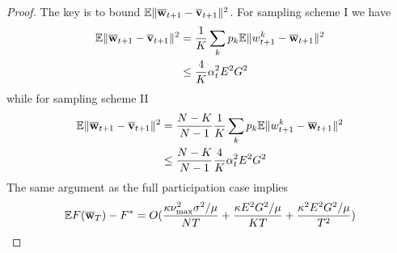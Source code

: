 \begin{proof}
	The key is to bound $\mathbb{E}\|{\overline{\mathbf{w}}}_{t+1}-{\overline{\mathbf{v}}}_{t+1}\|^{2}$.
	For sampling scheme I we have 
	\begin{align*}
	\mathbb{E}\|{\overline{\mathbf{w}}}_{t+1}-{\overline{\mathbf{v}}}_{t+1}\|^{2} & =\frac{1}{K}\sum_{k}p_{k}\mathbb{E}\|w_{t+1}^{k}-{\overline{\mathbf{w}}}_{t+1}\|^{2}\\
	& \leq\frac{4}{K}\alpha_{t}^{2}E^{2}G^{2}
	\end{align*}
	while for sampling scheme II 
	\begin{align*}
	\mathbb{E}\|{\overline{\mathbf{w}}}_{t+1}-{\overline{\mathbf{v}}}_{t+1}\|^{2} & =\frac{N-K}{N-1}\frac{1}{K}\sum_{k}p_{k}\mathbb{E}\|w_{t+1}^{k}-{\overline{\mathbf{w}}}_{t+1}\|^{2}\\
	& \leq\frac{N-K}{N-1}\frac{4}{K}\alpha_{t}^{2}E^{2}G^{2}
	\end{align*}
	The same argument as the full participation case implies 
	\begin{align*}
	\mathbb{E}F({\overline{\mathbf{w}}}_{T})-F^{\ast}=O(\frac{\kappa\nu_{\max}^{2}\sigma^{2}/\mu}{NT}+\frac{\kappa E^{2}G^{2}/\mu}{KT}+\frac{\kappa^{2}E^{2}G^{2}/\mu}{T^{2}})
	\end{align*}
	
	\begin{comment}
	\begin{proof}
	With partial participation, $2E\sum_{\tau=1}^{E-1}\alpha_{t-\tau}^{2}\sum_{k=1}^{N}p_{k}\left(\|\nabla F_{k}(\ov{w}_{t-\tau},\xi_{t-\tau}^{k})\|^{2}+l^{2}\|w_{t-\tau}^{k}-\ov{w}_{t-\tau}\|^{2}\right)$
	\begin{align*}
	\mathbb{E}\|\ov{w}_{t+1}-\vw^{\ast}\|^{2} & \leq\mathbb{E}(1-\mu\alpha_{t})\|\ov{w}_{t}-\vw^{\ast}\|^{2}+5E^{2}L\alpha_{t}^{3}G^{2}+\alpha_{t}^{2}\frac{1}{N}\nu_{max}^{2}\sigma^{2}+\frac{1}{K}\sum_{k}p^{k}\|w_{t}^{k}-\ov{w}_{t}\|^{2}\\
	& \leq\mathbb{E}(1-\mu\alpha_{t})\|\ov{w}_{t}-\vw^{\ast}\|^{2}+5E^{2}L\alpha_{t}^{3}G^{2}+\alpha_{t}^{2}\frac{1}{N}\nu_{max}^{2}\sigma^{2}+\frac{4}{K}\alpha_{t}^{2}E^{2}G^{2}\\
	& \leq\mathbb{E}(1-\mu\alpha_{t})(1-\mu\alpha_{t-1})\cdots(1-\mu\alpha_{t-E})\|\ov{w}_{t-E}-\vw^{\ast}\|^{2}=O(\frac{1}{t-E}\sigma^{2}+E^{2}LG^{2}\frac{1}{(t-E)^{2}}+\frac{E^{2}G^{2}}{K}\frac{1}{(t-E)^{3/2}})\\
	& +(\alpha_{t}^{3}+(1-\mu\alpha_{t-1})\alpha_{t-1}^{3}+(1-\mu\alpha_{t-1})(1-\mu\alpha_{t-2})\alpha_{t-2}^{3}+\cdots+(1-\mu\alpha_{t-1})\cdots(1-\mu\alpha_{t-E})\alpha_{t-E}^{3}E^{2}LG^{2}\\
	& +(\alpha_{t}^{2}+(1-\mu\alpha_{t-1})\alpha_{t-1}^{2}+(1-\mu\alpha_{t-1})(1-\mu\alpha_{t-2})\alpha_{t-2}^{2}+\cdots+(1-\mu\alpha_{t-1})\cdots(1-\mu\alpha_{t-E})\alpha_{t-E}^{2}\sigma^{2}\\
	& +\frac{4}{K}EG^{2}(\alpha_{t}^{2}+\alpha_{t-1}^{2}+\cdots+\alpha_{t-E}^{2})
	\end{align*}
	

\end{comment}
\end{proof}
